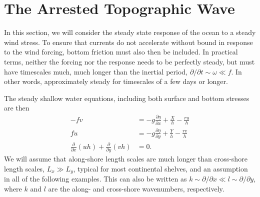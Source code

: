 \documentclass[11pt]{report}
\numberwithin{equation}{section}
\begin{document}
\section{The Arrested Topographic Wave\\
\normalsize\citet{csanady:78}}

In this section, we will consider the steady state response of the ocean to a steady wind stress.  To ensure that currents do not accelerate without bound in response to the wind forcing, bottom friction must also then be included.  In practical terms, neither the forcing nor the response needs to be perfectly steady, but must have timescales much, much longer than the inertial period, $\partial/\partial t \sim \omega \ll f$.  In other words, approximately steady for timescales of a few days or longer.  

The steady shallow water equations, including both surface and bottom stresses are then
\begin{align}
    - f v &= -g\frac{\partial \eta}{\partial x} + \frac{X}{h} - \frac{r u}{h}   \label{eq:u-atwi} \\
     f u &= -g\frac{\partial \eta}{\partial y}  + \frac{Y}{h} - \frac{r v}{h}   \label{eq:v-atwi} \\
    \frac{\partial}{\partial x} (u h) + \frac{\partial}{\partial y} (v h) &= 0. \label{eq:cont-atwi}
\end{align}
We will assume that along-shore length scales are much longer than cross-shore length scales, $L_x \gg L_y$, typical for most continental shelves, and an assumption in all of the following examples.  This can also be written as $ k \sim \partial/\partial x \ll l \sim \partial / \partial y$, where $k$ and $l$ are the along- and cross-shore wavenumbers, respectively.  
\end{document}
